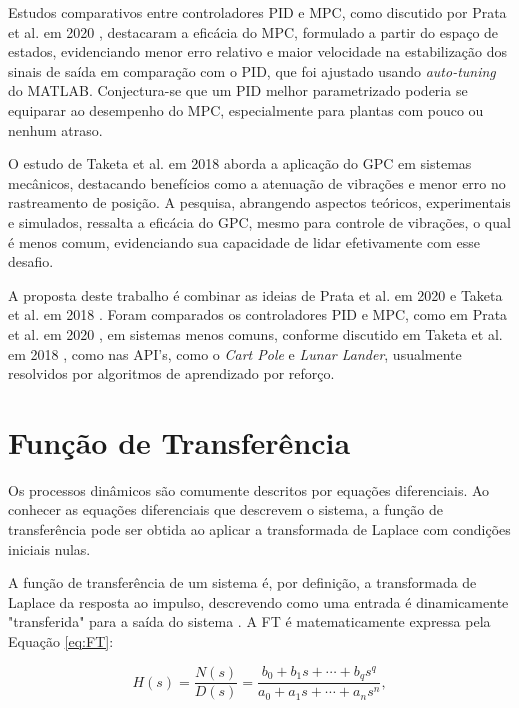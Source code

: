 \documentclass[12pt,           %
a4paper,                       %
openany,                       %
oneside,                       %
chapter=TITLE,                 %
english,                       %
spanish,                       %
brazil,                        %
sumario=tradicional]{abntex2}  %
\begin{document}
\begin{OnehalfSpace}
Estudos comparativos entre controladores PID e MPC, como discutido por Prata et al. em 2020 \cite{prata2020}, destacaram a eficácia do MPC, formulado a partir do espaço de estados, evidenciando menor erro relativo e maior velocidade na estabilização dos sinais de saída em comparação com o PID, que foi ajustado usando \textit{auto-tuning} do MATLAB\textregistered{}. Conjectura-se que um PID melhor parametrizado poderia se equiparar ao desempenho do MPC, especialmente para plantas com pouco ou nenhum atraso.

O estudo de Taketa et al. em 2018 \cite{taketa2018} aborda a aplicação do GPC em sistemas mecânicos, destacando benefícios como a atenuação de vibrações e menor erro no rastreamento de posição. A pesquisa, abrangendo aspectos teóricos, experimentais e simulados, ressalta a eficácia do GPC, mesmo para controle de vibrações, o qual é menos comum, evidenciando sua capacidade de lidar efetivamente com esse desafio.

A proposta deste trabalho é combinar as ideias de Prata et al. em 2020 \cite{prata2020} e Taketa et al. em 2018 \cite{taketa2018}. Foram comparados os controladores PID e MPC, como em Prata et al. em 2020 \cite{prata2020}, em sistemas menos comuns, conforme discutido em Taketa et al. em 2018 \cite{taketa2018}, como nas API's, como o \textit{Cart Pole} e \textit{Lunar Lander}, usualmente resolvidos por algoritmos de aprendizado por reforço.\\

\section{Função de Transferência}
\label{sec:FuncaodeTransferencia}

Os processos dinâmicos são comumente descritos por equações diferenciais. Ao conhecer as equações diferenciais que descrevem o sistema, a função de transferência pode ser obtida ao aplicar a transformada de Laplace com condições iniciais nulas.

A função de transferência de um sistema é, por definição, a transformada de Laplace da resposta ao impulso, descrevendo como uma entrada é dinamicamente "transferida"\: para a saída do sistema \cite{aguirre2004}. A FT é matematicamente expressa pela Equação \ref{eq:FT}:

\begin{equation} 
    \label{eq:FT}   %
	H(s) = \frac{N(s)}{D(s)} = \frac{b_0+b_{1}s+\cdots+b_{q}s^{q}}{a_0+a_{1}s+\cdots+a_{n}s^{n}},
\end{equation}


\end{OnehalfSpace}
\end{document}
